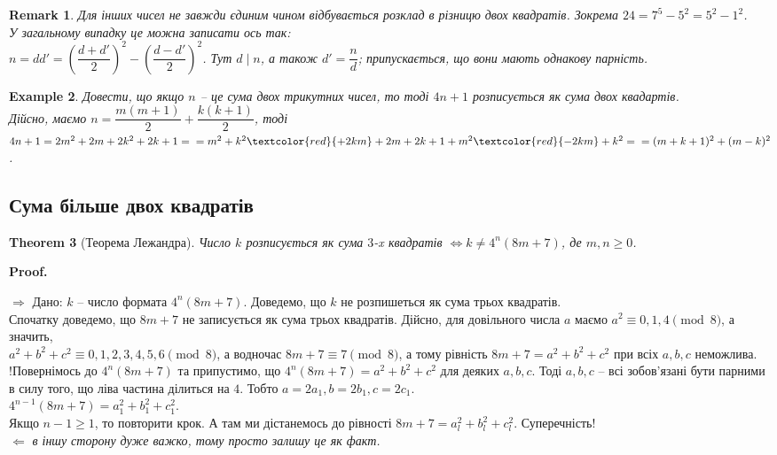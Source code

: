 \documentclass[a4paper, 14pt]{extarticle}
\makeatletter
\theoremstyle{theoremdd}
\newtheorem{theorem}{Theorem}[subsection]
\theoremstyle{theoremdd}
\theoremstyle{theoremdd}
\theoremstyle{theoremdd}
\newtheorem{example}[theorem]{Example}
\theoremstyle{theoremdd}
\theoremstyle{theoremdd}
\newtheorem{remark}[theorem]{Remark}
\theoremstyle{theoremdd}
\theoremstyle{theoremdd}
\def\qed{$\blacksquare$}
\def\rightproof{$\boxed{\Rightarrow}$ }
\def\leftproof{$\boxed{\Leftarrow}$ }
\renewenvironment{proof}[1][Proof.\\]{\par
\pushQED{\hfill \qed}%
\normalfont \topsep6\p@\@plus6\p@\relax
\trivlist
\item\relax
{\bfseries
#1\@addpunct{.}}\hspace\labelsep\ignorespaces
}{%
\popQED\endtrivlist\@endpefalse
}
\makeatother
\begin{document}
\begin{remark}
Для інших чисел не завжди єдиним чином відбувається розклад в різницю двох квадратів. Зокрема $24 = 7^5-5^2 = 5^2-1^2$.\\
У загальному випадку це можна записати ось так:\\
$n = dd' = \left( \dfrac{d+d'}{2} \right)^2 - \left( \dfrac{d-d'}{2} \right)^2$. Тут $d \mid n$, а також $d' = \dfrac{n}{d}$; припускається, що вони мають однакову парність.
\end{remark}

\begin{example}
Довести, що якщо $n$ -- це сума двох трикутних чисел, то тоді $4n+1$ розписується як сума двох квадартів.\\
Дійсно, маємо $n = \dfrac{m(m+1)}{2} + \dfrac{k(k+1)}{2}$, тоді\\
$4n+1 = 2m^2+2m+2k^2+2k+1 = \\ = m^2+k^2\textcolor{red}{+2km} + 2m+2k + 1 + m^2 \textcolor{red}{-2km} + k^2 = \\
= (m+k+1)^2 + (m-k)^2$.
\end{example}

\subsection{Сума більше двох квадратів}
\begin{theorem}[Теорема Лежандра]
Число $k$ розписується як сума $3$-x квадратів $\iff k \neq 4^n (8m+7)$, де $m,n \geq 0$.
\end{theorem}

\begin{proof}
\rightproof Дано: $k$ -- число формата $4^n (8m+7)$. Доведемо, що $k$ не розпишеться як сума трьох квадратів.\\
Спочатку доведемо, що $8m+7$ не записується як сума трьох квадратів. Дійсно, для довільного числа $a$ маємо $a^2 \equiv 0,1,4 \pmod 8$, а значить,\\
$a^2+b^2+c^2 \equiv 0,1,2,3,4,5,6 \pmod 8$, а водночас $8m+7 \equiv 7 \pmod 8$, а тому рівність $8m+7 = a^2+b^2+c^2$ при всіх $a,b,c$ неможлива.\\
!Повернімось до $4^n (8m+7)$ та припустимо, що $4^n (8m+7) = a^2+b^2+c^2$ для деяких $a,b,c$. Тоді $a,b,c$ -- всі зобов'язані бути парними в силу того, що ліва частина ділиться на $4$. Тобто $a = 2a_1,b=2b_1,c=2c_1$.\\
$4^{n-1}(8m+7) = a_1^2 + b_1^2 + c_1^2$.\\
Якщо $n-1 \geq 1$, то повторити крок. А там ми дістанемось до рівності $8m+7 = a_l^2 + b_l^2 + c_l^2$. Суперечність!
\bigskip \\
\leftproof \textit{в іншу сторону дуже важко, тому просто залишу це як факт.}
\end{proof}
\end{document}
